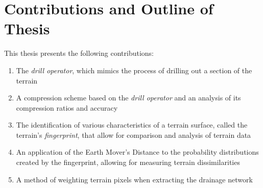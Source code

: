 
\section{Contributions and Outline of Thesis}


This thesis presents the following contributions:

\begin{enumerate}
  \item The \emph{drill operator}, which mimics the process of drilling out a section of the terrain
    \item A compression scheme based on the \emph{drill operator} and an analysis of its compression ratios and accuracy
  \item The identification of various characteristics of a terrain surface, called the terrain's \emph{fingerprint}, that allow for comparison and analysis of terrain data
  \item An application of the Earth Mover's Distance to the probability distributions created by the fingerprint, allowing for measuring terrain dissimilarities
  \item A method of weighting terrain pixels when extracting the drainage network

\end{enumerate}
